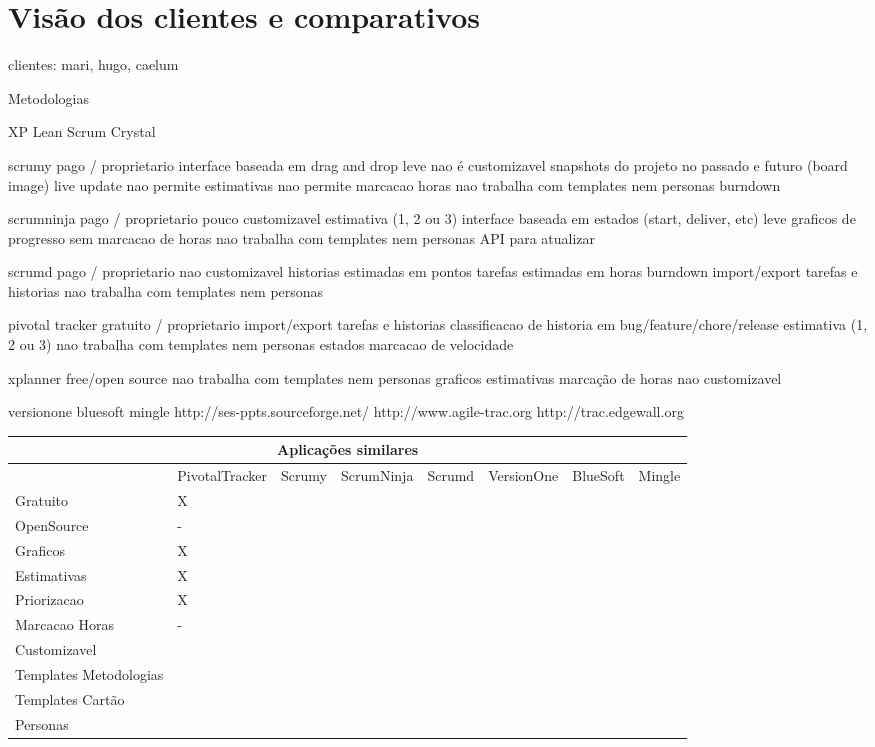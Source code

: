 \section{Visão dos clientes e comparativos}

clientes: mari, hugo, caelum

Metodologias

XP
Lean
Scrum
Crystal


scrumy
	pago / proprietario
	interface baseada em drag and drop
	leve
	nao é customizavel
	snapshots do projeto no passado e futuro (board image)
	live update
	nao permite estimativas
	nao permite marcacao horas
	nao trabalha com templates nem personas
	burndown
	
scrumninja
	pago / proprietario
	pouco customizavel
	estimativa (1, 2 ou 3)
	interface baseada em estados (start, deliver, etc)
	leve
	graficos de progresso
	sem marcacao de horas
	nao trabalha com templates nem personas
	API para atualizar 

scrumd
  pago / proprietario
  nao customizavel
  historias estimadas em pontos
  tarefas estimadas em horas
  burndown
	import/export tarefas e historias
	nao trabalha com templates nem personas

pivotal tracker
	gratuito / proprietario
	import/export tarefas e historias
	classificacao de historia em bug/feature/chore/release
	estimativa (1, 2 ou 3)
	nao trabalha com templates nem personas
	estados
	marcacao de velocidade
	
xplanner
	free/open source
	nao trabalha com templates nem personas
	graficos
	estimativas
	marcação de horas
	nao customizavel
	
	
	
versionone
bluesoft
mingle
http://ses-ppts.sourceforge.net/
http://www.agile-trac.org
http://trac.edgewall.org


\begin{sidewaystable}
	\begin{tabular}{|l|l|l|l|l|l|l|l}
		\hline
		\multicolumn{8}{|c|}{Aplicações similares} \\
		\hline
		 & PivotalTracker & Scrumy & ScrumNinja & Scrumd & VersionOne & BlueSoft & Mingle \\
		Gratuito & X & & & & & & \\
		OpenSource & - & & & & & & \\
		Graficos & X & & & & & & \\
		Estimativas & X & & & & & & \\
		Priorizacao & X & & & & & & \\
		Marcacao Horas & - & & & & & & \\
		Customizavel & & & & & & & \\
		Templates Metodologias & & & & & & & \\
		Templates Cartão & & & & & & & \\
		Personas & & & & & & & \\
		\hline
	\end{tabular}
\end{sidewaystable}


